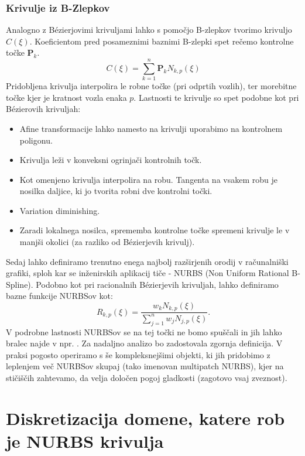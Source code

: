 \documentclass{article}
\begin{document}
\subsubsection{Krivulje iz B-Zlepkov}
Analogno z Bézierjovimi krivuljami lahko s pomočjo B-zlepkov tvorimo krivuljo $C(\xi)$. Koeficientom pred posameznimi baznimi B-zlepki spet rečemo kontrolne točke $\textbf{P}_k$.
\begin{equation}
 C(\xi) = \sum_{k=1}^n \textbf{P}_k N_{k,p}(\xi)
\end{equation}
Pridobljena krivulja interpolira le robne točke (pri odprtih vozlih), ter morebitne točke kjer je kratnost vozla enaka $p$. 
Lastnosti te krivulje so spet podobne kot pri Bézierovih krivuljah:
\begin{itemize}
\item Afine transformacije lahko namesto na krivulji uporabimo na kontrolnem poligonu.
\item Krivulja leži v konveksni ogrinjači kontrolnih točk.
\item Kot omenjeno krivulja interpolira na robu. Tangenta na vsakem robu je nosilka daljice, ki jo tvorita robni dve kontrolni točki.
\item Variation diminishing.
\item Zaradi lokalnega nosilca, sprememba kontrolne točke spremeni krivulje le v manjši okolici (za razliko od Bézierjevih krivulj).
\end{itemize}
Sedaj lahko definiramo trenutno enega najbolj razširjenih orodij v računalniški grafiki, sploh kar se inženirskih aplikacij tiče - NURBS (Non Uniform Rational B-Spline).
Podobno kot pri racionalnih Bézierjevih krivuljah, lahko definiramo bazne funkcije NURBSov kot:
\begin{equation}
R_{k,p} (\xi) = \frac{w_k N_{k,p} (\xi)}{\sum_{j=1}^n w_j N_{j,p}(\xi)}.
\end{equation}
V podrobne lastnosti NURBSov se na tej točki ne bomo spuščali in jih lahko bralec najde v npr. \cite{iso1}. Za nadaljno analizo bo zadostovala zgornja definicija. V praksi pogosto operiramo s še kompleksnejšimi objekti, ki jih pridobimo z leplenjem več NURBSov skupaj (tako imenovan multipatch NURBS), kjer na stičiščih zahtevamo, da velja določen pogoj gladkosti (zagotovo vsaj zveznost).

\section{Diskretizacija domene, katere rob je NURBS krivulja}
\end{document}
